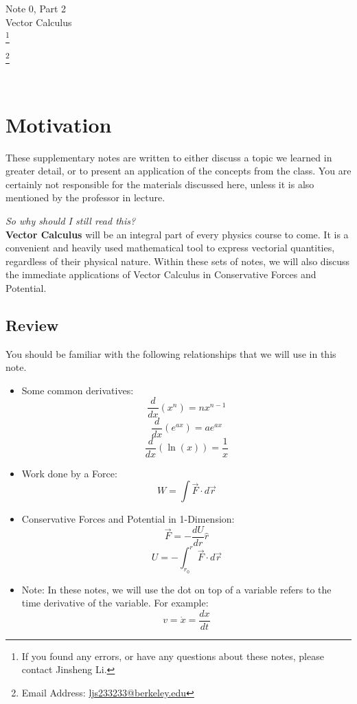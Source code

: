 \documentclass[11pt]{article}
\newcommand\blfootnote[1]{
    \begingroup
    \renewcommand\thefootnote{}\footnote{#1}
    \addtocounter{footnote}{-1}
    \endgroup
}
\theoremstyle{gangnamstyle}{\newtheorem{definition}{Definition}[]}
\theoremstyle{gangnamstyle}{\newtheorem{example}{Example}[]}
\theoremstyle{gangnamstyle}{\newtheorem{problem}{Problem}[]}
\begin{document}
\normalfont
\pagestyle{pages}


\begin{center}
\vspace{3in}
{\Large Note 0, Part 2 } \\[0.05in]
Vector Calculus  \\ 
\blfootnote{If you found any errors, or have any questions about these notes, please contact Jinsheng Li.} \blfootnote{Email Address: \href{mailto:ljs233233@berkeley.edu}{ljs233233@berkeley.edu}} \\ [-0.5in]
\end{center}

\section*{Motivation}

These supplementary notes are written to either discuss a topic we learned in greater detail, or to present an application of the concepts from the class. You are certainly not responsible for the materials discussed here, unless it is also mentioned by the professor in lecture. 

\textit{So why should I still read this?} \\
\textbf{Vector Calculus} will be an integral part of every physics course to come. It is a convenient and heavily used mathematical tool to express vectorial quantities, regardless of their physical nature. Within these sets of notes, we will also discuss the immediate applications of Vector Calculus in Conservative Forces and Potential. 

\subsection*{Review}

You should be familiar with the following relationships that we will use in this note. 

\begin{itemize}
\item Some common derivatives:
\[ \frac{d}{dx}(x^n) = nx^{n - 1} \]
\[ \frac{d}{dx}(e^{ax}) = ae^{ax} \]
\[ \frac{d}{dx}(\ln(x)) = \frac{1}{x} \]
\item Work done by a Force:
\[ W = \int \Vec{F} \cdot d\Vec{r} \]
\item Conservative Forces and Potential in 1-Dimension:
\[ \Vec{F} = - \frac{dU}{dr}\hat{r} \]
\[ U = - \int_{r_0}^r \Vec{F} \cdot d\Vec{r} \]
\item Note: In these notes, we will use the dot on top of a variable refers to the time derivative of the variable. For example: 
\[ v = \Dot{x} = \frac{dx}{dt} \]
\end{itemize}
\pagebreak
\end{document}
